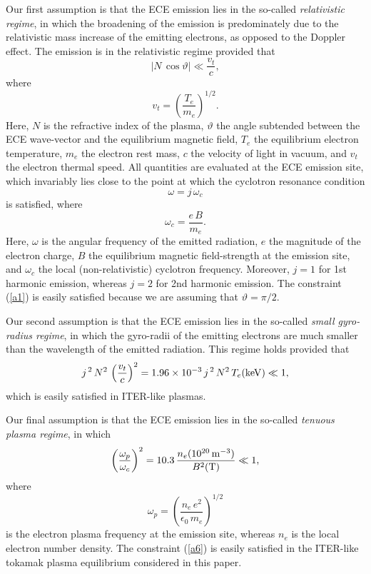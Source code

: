 \documentclass[12pt,prb,aps]{revtex4-1}
\begin{document}
Our first assumption is that the ECE emission lies in the so-called {\em relativistic regime}, in which the
broadening of the emission is predominately due to the relativistic mass increase of the emitting electrons, as opposed to the Doppler effect. The
emission is in the relativistic regime provided that
\begin{equation}\label{a1}
|N\,\cos\vartheta|  \ll \frac{v_t}{c},
\end{equation}
where
\begin{equation}
v_t = \left(\frac{T_e}{m_e}\right)^{1/2}.
\end{equation}
Here, $N$ is the refractive index of the plasma, $\vartheta$ the angle subtended between the ECE wave-vector and the equilibrium magnetic field, $T_e$ the equilibrium electron
temperature, $m_e$ the electron rest mass, $c$ the velocity of light in vacuum, and $v_t$ the electron thermal speed.  All quantities are evaluated at the ECE emission site, which invariably
lies 
close to the point at which the cyclotron resonance condition
\begin{equation}
\omega = j\,\omega_c
\end{equation}
is satisfied, 
where 
\begin{equation}
\omega_c = \frac{e\,B}{m_e}.
\end{equation}
Here, $\omega$ is the angular frequency of the emitted radiation, $e$ the magnitude of the electron charge, $B$ the equilibrium magnetic field-strength at the emission site, and $\omega_c$  the local (non-relativistic) cyclotron frequency. 
Moreover, $j=1$ for 1st harmonic emission, whereas $j=2$ for 2nd harmonic emission. The constraint (\ref{a1}) is easily satisfied because we are assuming that
$\vartheta=\pi/2$. 

Our second assumption is that the ECE emission lies in the so-called {\em small gyro-radius regime}, in which the gyro-radii of the emitting electrons are much smaller than
the wavelength of the emitted radiation. This regime holds provided that 
\begin{equation}
j^{\,2}\,N^2\,\left(\frac{v_t}{c}\right)^2 = 1.96\times 10^{-3}\,j^{\,2}\,N^2\,T_e({\rm keV}) \ll 1,
\end{equation}
which is easily satisfied in ITER-like plasmas. 

Our final assumption is that the ECE emission lies in the so-called {\em tenuous plasma regime}, in which
\begin{equation}\label{a6}
\left(\frac{\omega_p}{\omega_c}\right)^2 = 10.3\,\frac{n_e(10^{20}\,{\rm m}^{-3})}{B^2({\rm T})}\ll 1,
\end{equation}
where
\begin{equation}
\omega_p = \left(\frac{n_e\,e^2}{\epsilon_0\,m_e}\right)^{1/2}
\end{equation}
is the electron plasma frequency at the emission site, whereas $n_e$ is the local electron number density. The constraint (\ref{a6}) is
easily satisfied in the ITER-like tokamak plasma equilibrium considered in this paper. 
\end{document}
